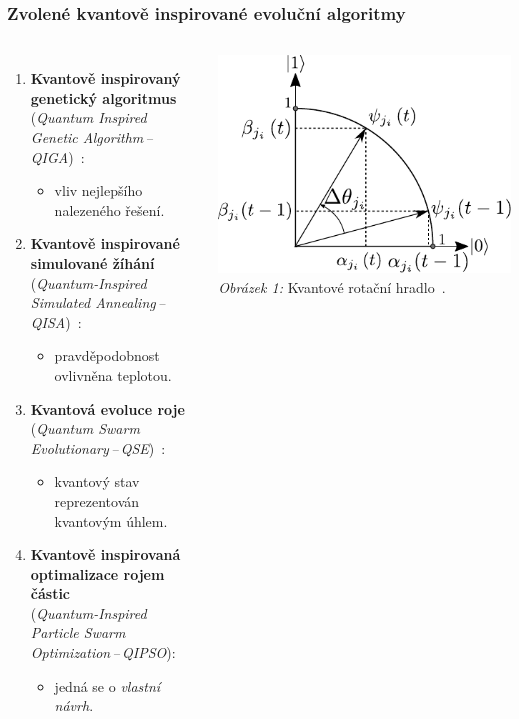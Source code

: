 \begin{frame}
  \frametitle{Zvolené kvantově inspirované evoluční algoritmy}
  \small
  \begin{columns}
      \begin{enumerate}
        \item \textbf{Kvantově inspirovaný genetický algoritmus}\\(\textit{Quantum Inspired Genetic Algorithm\,--\,QIGA})~\cite{qiga}:
        \begin{itemize}
          \item vliv nejlepšího nalezeného řešení.
        \end{itemize}
        \item \textbf{Kvantově inspirované simulované žíhání}\\(\textit{Quantum-Inspired Simulated Annealing\,--\,QISA})~\cite{qisa}:
        \begin{itemize}
          \item pravděpodobnost ovlivněna teplotou.
        \end{itemize}
        \item \textbf{Kvantová evoluce roje}\\(\textit{Quantum Swarm Evolutionary\,--\,QSE})~\cite{qse}:
        \begin{itemize}
          \item kvantový stav reprezentován kvantovým úhlem.
        \end{itemize}
        \item \textbf{Kvantově inspirovaná optimalizace rojem částic}\\(\textit{Quantum-Inspired Particle Swarm Optimization\,--\,QIPSO}): 
        \begin{itemize}
          \item jedná se o \emph{vlastní návrh}.
        \end{itemize}
      \end{enumerate}
    \includegraphics[width=\textwidth]{img/qiga-rotation-gate.pdf}
    {
      \vspace{0.5em}
      \scriptsize
      \centering
      \emph{Obrázek 1:} Kvantové rotační hradlo~\cite{qisa}.
    }
  \end{columns}
\end{frame}

